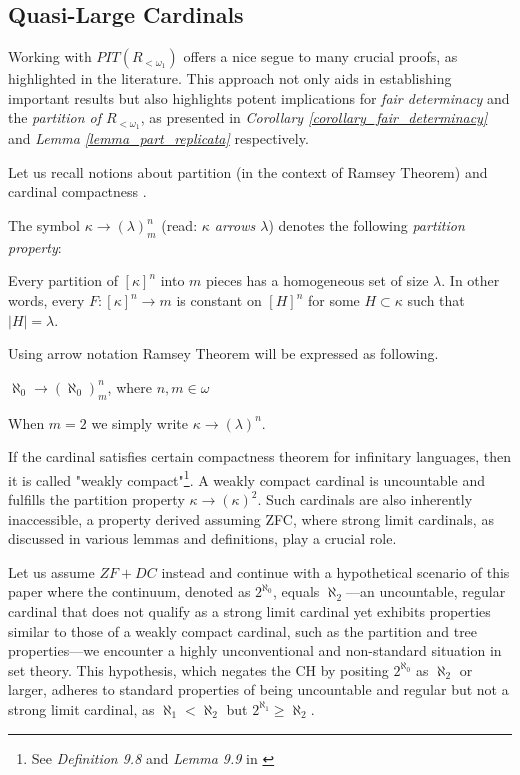 \subsection{Quasi-Large Cardinals}\label{subsection_quasilarge_cardinals}

Working with \( PIT(R_{<\omega_1}) \) offers a nice segue to many crucial proofs, as highlighted in the literature. This approach not only aids in establishing important results but also highlights potent implications for \textit{fair determinacy} and the \textit{partition of \( R_{<\omega_1} \)}, as presented in \textit{Corollary \ref{corollary_fair_determinacy}} and \textit{Lemma \ref{lemma_part_replicata}} respectively.

Let us recall notions about partition (in the context of Ramsey Theorem) and cardinal compactness \cite{jech2003set}.

The symbol $\kappa \longrightarrow (\lambda)^n_m$ (read: \textit{$\kappa$ arrows $\lambda$}) denotes the following \textit{partition property}: 

\begin{definition}
Every partition of $[\kappa]^n$ into $m$ pieces has a homogeneous set of size $\lambda$. In other words, every $F : [\kappa]^n \longrightarrow m$ is constant on $[H]^n$ for some $H \subset \kappa$ such that $|H| = \lambda$.
\end{definition}

Using arrow notation Ramsey Theorem will be expressed as following.

\begin{theorem}
  $\aleph_0 \longrightarrow (\aleph_0)^n_m$, where $n,m \in \omega$
\end{theorem}

When $m=2$ we simply write $\kappa \to (\lambda)^n$.

If the cardinal satisfies certain compactness theorem for infinitary languages, then it is called "weakly compact"\footnote{See \textit{Definition 9.8} and \textit{Lemma 9.9} in \cite{jech2003set}}. A weakly compact cardinal is uncountable and fulfills the partition property \( \kappa \longrightarrow (\kappa)^2 \). Such cardinals are also inherently inaccessible, a property derived assuming ZFC, where strong limit cardinals, as discussed in various lemmas and definitions, play a crucial role.

Let us assume $ZF+DC$ instead and continue with a hypothetical scenario of this paper where the continuum, denoted as \( 2^{\aleph_0} \), equals \( \aleph_2 \)—an uncountable, regular cardinal that does not qualify as a strong limit cardinal yet exhibits properties similar to those of a weakly compact cardinal, such as the partition and tree properties—we encounter a highly unconventional and non-standard situation in set theory. This hypothesis, which negates the CH by positing \( 2^{\aleph_0} \) as \( \aleph_2 \) or larger, adheres to standard properties of being uncountable and regular but not a strong limit cardinal, as \( \aleph_1 < \aleph_2 \) but \( 2^{\aleph_1} \geq \aleph_2 \). 

